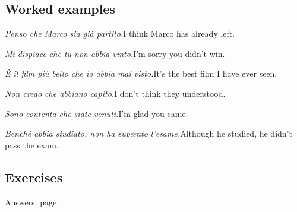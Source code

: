 \documentclass[11pt,a4paper,twoside,openright]{book}
\begin{document}
\subsection*{Worked examples}
\begin{examples}
\item\relax \textit{Penso che Marco sia già partito.}\newline I think Marco has already left.
\item\relax \textit{Mi dispiace che tu non abbia vinto.}\newline I'm sorry you didn't win.
\item\relax \textit{È il film più bello che io abbia mai visto.}\newline It's the best film I have ever seen.
\item\relax \textit{Non credo che abbiano capito.}\newline I don't think they understood.
\item\relax \textit{Sono contenta che siate venuti.}\newline I'm glad you came.
\item\relax \textit{Benché abbia studiato, non ha superato l'esame.}\newline Although he studied, he didn't pass the exam.
\end{examples}

\subsection*{Exercises}\label{les:congiuntivo-passato:exercises}
{\color{muted}\small Answers: page~\pageref{ans:congiuntivo-passato}.}
\end{document}
